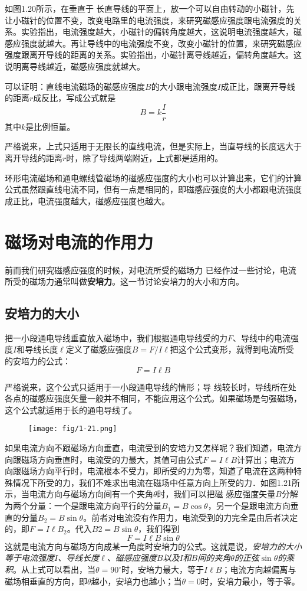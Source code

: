 如图1.20所示，在垂直于
长直导线的平面上，放一个可以自由转动的小磁针，先让小磁针的位置不变，改变电路里的电流强度，来研究磁感应强度跟电流强度的关系。实验指出，电流强度越大，小磁针的偏转角度越大，这说明电流强度越大，磁感应强度就越大。再让导线中的电流强度不变，改变小磁针的位置，来研究磁感应强度跟离开导线的距离的关系。实验指出，小磁针离导线越近，偏转角度越大。这说明离导线越近，磁感应强度就越大。

可以证明：直线电流磁场的磁感应强度$B$的大小跟电流强度$I$成正比，跟离开导线的距离$r$成反比，写成公式就是
\[B=k\frac{I}{r}\]
其中$k$是比例恒量。

严格说来，上式只适用于无限长的直线电流，但是实际上，当直导线的长度远大于离开导线的距离$r$时，除了导线两端附近，上式都是适用的。

环形电流磁场和通电螺线管磁场的磁感应强度的大小也可以计算出来，它们的计算公式虽然跟直线电流不同，但有一点是相同的，即磁感应强度的大小都跟电流强度成正比，电流强度越大，磁感应强度也越大。

\section{磁场对电流的作用力}
前而我们研究磁感应强度的时候，对电流所受的磁场力
已经作过一些讨论，电流所受的磁场力通常叫做\textbf{安培力}。这一节讨论安培力的大小和方向。

\subsection{安培力的大小}

把一小段通电导线垂直放入磁场中，我们根据通电导线受的力$F$、导线中的电流强度$I$和导线长度$\ell$定义了磁感应强度$B=F/I\ell$把这个公式变形，就得到电流所受的安培力的公式：
\[F=I\ell B\]

严格说来，这个公式只适用于一小段通电导线的情形；导
线较长时，导线所在处各点的磁感应强度矢量一般并不相同，不能应用这个公式。如果磁场是匀强磁场，这个公式就适用于长的通电导线了。
\begin{figure}[htp]\centering
	\texttt{[image: fig/1-21.png]}
	\caption{ }
\end{figure}

如果电流方向不跟磁场方向垂直，电流受到的安培力又怎样呢？我们知道，电流方向跟磁场方向垂直时，电流受的力最大，其值可由公式$F=I\ell B$计算出；电流方向跟磁场方向平行时，电流根本不受力，即所受的力为零，知道了电流在这两种特殊情况下所受的力，我们不难求出电流在磁场中任意方向上所受的力．如图1.21所示，当电流方向与磁场方向间有一个夹角$\theta$时，我们可以把磁
感应强度矢量$B$分解为两个分量：一个是跟电流方向平行的分量$B_1=B\cos\theta$，另一个是跟电流方向垂直的分量$B_2=B\sin\theta$。前者对电流没有作用力，电流受到的力完全是由后者决定的，即$F=I\ell B_2$。代入$B2=B\sin\theta$，我们得到
\[F=I\ell B\sin\theta\]
这就是电流方向与磁场方向成某一角度时安培力的公式。这就是说，\textit{安培力的大小等于电流强度$I$、导线长度$\ell$、磁感应强度$B$以及$I$和$B$间的夹角$\theta$的正弦$\sin\theta$的乘积}。从上式可以看出，当$\theta =90^{\circ}$时，安培力最大，等于$I\ell B$；电流方向越偏离与磁场相垂直的方向，即$\theta$越小，安培力也越小；当$\theta =0$时，安培力最小，等于零。

